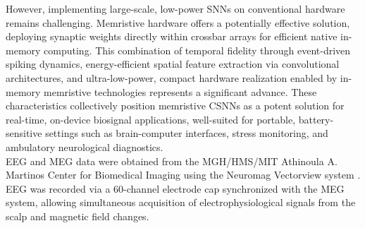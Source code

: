 
\noindent However, implementing large-scale, low-power SNNs on conventional hardware remains challenging. Memristive hardware offers a potentially effective solution, deploying synaptic weights directly within crossbar arrays for efficient native in-memory computing. This combination of temporal fidelity through event-driven spiking dynamics, energy-efficient spatial feature extraction via convolutional architectures, and ultra-low-power, compact hardware realization enabled by in-memory memristive technologies represents a significant advance. These characteristics collectively position memristive CSNNs as a potent solution for real-time, on-device biosignal applications, well-suited for portable, battery-sensitive settings such as brain-computer interfaces, stress monitoring, and ambulatory neurological diagnostics.\\



\noindent EEG and MEG data were obtained from the MGH/HMS/MIT Athinoula A. Martinos Center for Biomedical Imaging using the Neuromag Vectorview system \cite{Gramfort2020-jm}. EEG was recorded via a 60-channel electrode cap synchronized with the MEG system, allowing simultaneous acquisition of electrophysiological signals from the scalp and magnetic field changes.\\


